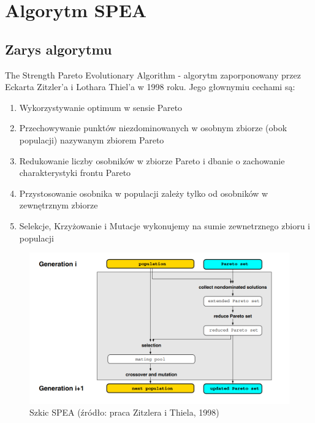 \documentclass[a4paper]{article}
\begin{document}
\section{Algorytm SPEA}
\subsection{Zarys algorytmu}
The Strength Pareto Evolutionary
Algorithm - algorytm zaporponowany przez Eckarta Zitzler'a i Lothara Thiel'a w 1998 roku. Jego głownymiu cechami są:
\begin{enumerate}
\item Wykorzystywanie optimum w sensie Pareto
\item Przechowywanie punktów niezdominowanych w osobnym zbiorze (obok populacji) nazywanym zbiorem Pareto
\item Redukowanie liczby osobników w zbiorze Pareto i dbanie o zachowanie charakterystyki frontu Pareto
\item Przystosowanie osobnika w populacji zależy tylko od osobników w zewnętrznym zbiorze
\item Selekcje, Krzyżowanie i Mutacje wykonujemy na sumie zewnetrznego zbioru i populacji
\end{enumerate}

\begin{figure}[htbp]{}
\centerline{\includegraphics[scale=.45]{szkic_alg.png}}
\caption{Szkic SPEA (źródło: praca Zitzlera i Thiela, 1998)}
\label{fig:szkic_alg}
\end{figure}
\end{document}
